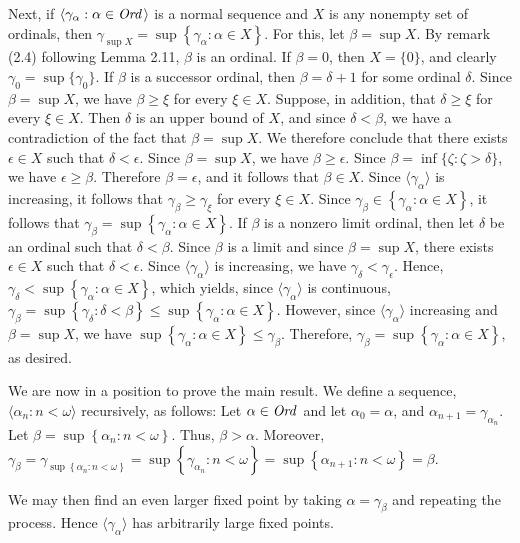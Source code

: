 \begin{solution}
Next, if $\langle \gamma_{\alpha} : \alpha \in \textit{Ord\,} \rangle$ is a normal 
sequence and $X$ is any nonempty set of ordinals, then 
$\gamma_{\sup X} = \sup \left \{ \gamma_{\alpha} : \alpha \in X \right \}$. For 
this, let $\beta = \sup X$. By remark (2.4) following Lemma 2.11, $\beta$ is an 
ordinal. If $\beta = 0$, then $X = \{ 0 \}$, and clearly 
$\gamma_0 = \sup \{ \gamma_0 \}$. If $\beta$ is a successor ordinal, then 
$\beta = \delta + 1$ for some ordinal $\delta$. Since $\beta = \sup X$, we have 
$\beta \geq \xi$ for every $\xi \in X$. Suppose, in addition, that 
$\delta \geq \xi$ for every $\xi \in X$. Then $\delta$ is an upper bound of 
$X$, and since $\delta < \beta$, we have a contradiction of the fact that 
$\beta = \sup X$. We therefore conclude that there exists $\epsilon \in X$ such 
that $\delta < \epsilon$. Since $\beta = \sup X$, we have 
$\beta \geq \epsilon$. Since $\beta = \inf \{ \zeta : \zeta > \delta \}$, we 
have $\epsilon \geq \beta$. Therefore $\beta = \epsilon$, and it follows that 
$\beta \in X$. Since $\langle \gamma_{\alpha} \rangle$ is increasing, it 
follows that $\gamma_{\beta} \geq \gamma_{\xi}$ for every $\xi \in X$. Since 
$\gamma_{\beta} \in \left \{ \gamma_{\alpha} : \alpha \in X \right \}$, it 
follows that 
$\gamma_{\beta} = \sup \left \{ \gamma_{\alpha} : \alpha \in X \right \}$. If 
$\beta$ is a nonzero limit ordinal, then let $\delta$ be an ordinal such that 
$\delta < \beta$. Since $\beta$ is a limit and since $\beta = \sup X$, there 
exists $\epsilon \in X$ such that $\delta < \epsilon$. Since 
$\langle \gamma_{\alpha} \rangle$ is increasing, we have 
$\gamma_{\delta} < \gamma_{\epsilon}$. Hence, 
$\gamma_{\delta} < \sup \left \{ \gamma_{\alpha} : \alpha \in X \right \}$, 
which yields, since $\langle \gamma_{\alpha} \rangle$ is continuous, 
$\gamma_{\beta} = \sup \left \{ \gamma_{\delta} : \delta < \beta \right \} \leq 
  \sup \left \{ \gamma_{\alpha} : \alpha \in X \right \}$. However, since 
$\langle \gamma_{\alpha} \rangle$ increasing and $\beta = \sup X$, we have 
$\sup \left \{ \gamma_{\alpha} : \alpha \in X \right \} \leq \gamma_{\beta}$. 
Therefore, 
$\gamma_{\beta} = \sup \left \{ \gamma_{\alpha} : \alpha \in X \right \}$, as 
desired.

We are now in a position to prove the main result. We define a sequence, 
$\langle \alpha_n : n < \omega \rangle$ recursively, as follows: Let 
$\alpha \in \textit{Ord\,}$ and let $\alpha_0 = \alpha$, and 
$\alpha_{n + 1} = \gamma_{\alpha_n}$. Let 
$\beta = \sup \left \{ \alpha_n : n < \omega \right \}$. Thus, 
$\beta > \alpha$. Moreover, 
$\gamma_{\beta} = \gamma_{\sup \left \{ \alpha_n : n < \omega \right \}} = \sup 
  \left \{ \gamma_{\alpha_n} : n < \omega \right \} = \sup \left \{ 
  \alpha_{n + 1} : n < \omega \right \} = \beta$.

We may then find an even larger fixed point by taking 
$\alpha = \gamma_{\beta}$ and repeating the process. Hence 
$\langle \gamma_{\alpha} \rangle$ has arbitrarily large fixed points.
\end{solution}

